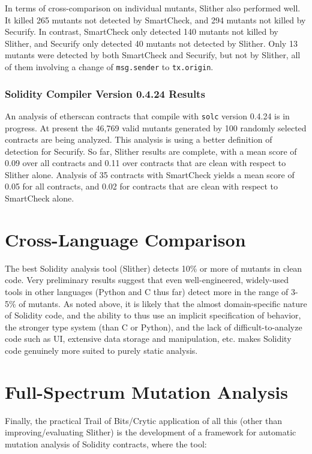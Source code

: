 \documentclass{article}
\begin{document}
In terms of cross-comparison on individual mutants, Slither also performed well.  It killed 265 mutants not detected by SmartCheck, and 294 mutants not killed by Securify.  In contrast, SmartCheck only detected 140 mutants not killed by Slither, and Securify only detected 40 mutants not detected by Slither.  Only 13 mutants were detected by both SmartCheck and Securify, but not by Slither, all of them involving a change of {\tt msg.sender} to {\tt tx.origin}.

\subsubsection{Solidity Compiler Version 0.4.24 Results}

An analysis of etherscan contracts that compile with {\tt solc} version 0.4.24 is in progress.  At present the 46,769 valid mutants generated by 100 randomly selected contracts are being analyzed.  This analysis is using a better definition of detection for Securify.  So far, Slither results are complete, with a mean score of 0.09 over all contracts and 0.11 over contracts that are clean with respect to Slither alone.  Analysis of 35 contracts with SmartCheck yields a mean score of 0.05 for all contracts, and 0.02 for contracts that are clean with respect to SmartCheck alone.

\section{Cross-Language Comparison}

The best Solidity analysis tool (Slither) detects 10\% or more of mutants in clean code.   Very preliminary results suggest that even well-engineered, widely-used tools in other languages (Python and C thus far) detect more in the range of 3-5\% of mutants.  As noted above, it is likely that the almost domain-specific nature of Solidity code, and the ability to thus use an implicit specification of behavior, the stronger type system (than C or Python), and the lack of difficult-to-analyze code such as UI, extensive data storage and manipulation, etc. makes Solidity code genuinely more suited to purely static analysis. 

\section{Full-Spectrum Mutation Analysis}

Finally, the practical Trail of Bits/Crytic application of all this (other than improving/evaluating Slither) is the development of a framework for automatic mutation analysis of Solidity contracts, where the tool:
\end{document}
